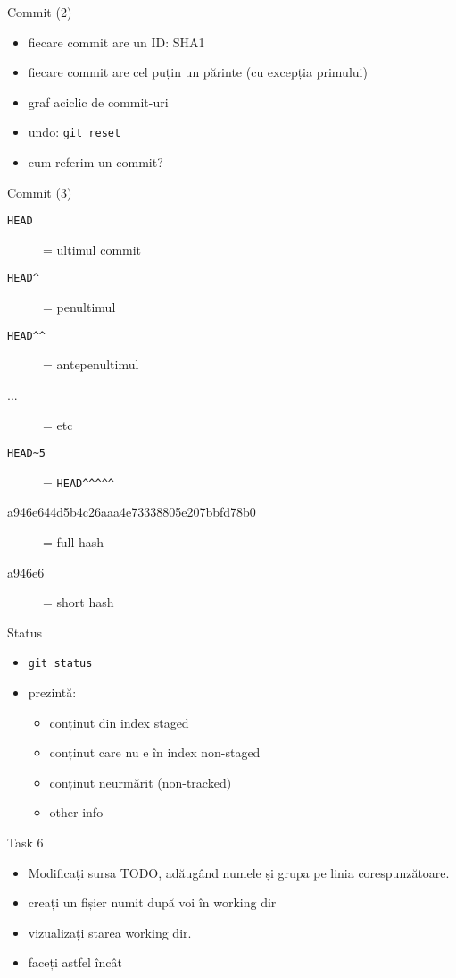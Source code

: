 \documentclass{beamer}
\begin{document}
\begin{frame}{Commit (2)}
  \begin{itemize}
    \item fiecare commit are un ID: SHA1
    \item fiecare commit are cel puțin un părinte (cu excepția primului)
    \item graf aciclic de commit-uri
    \pause
    \item undo: \texttt{git reset}
    \pause
    \item cum referim un commit?
  \end{itemize}
\end{frame}

\begin{frame}{Commit (3)}
  \begin{description}
    \item[\texttt{HEAD}] = ultimul commit
    \item[\texttt{HEAD\textasciicircum}] = penultimul
    \item[\texttt{HEAD\textasciicircum\textasciicircum}] = antepenultimul
    \item[...] = etc
    \pause
    \item[\texttt{HEAD\textasciitilde5}] = \texttt{HEAD\textasciicircum\textasciicircum\textasciicircum\textasciicircum\textasciicircum}
    \pause
    \item[a946e644d5b4c26aaa4e73338805e207bbfd78b0] = full hash
    \pause
    \item[a946e6] = short hash
  \end{description}
\end{frame}

\begin{frame}{Status}
  \begin{itemize}
    \item \texttt{git status}
    \item prezintă:
      \begin{itemize}
        \item conținut din index {staged}
        \item conținut care nu e în index {non-staged}
        \item conținut neurmărit (non-tracked)
        \item other info
      \end{itemize}
  \end{itemize}
  \pause
  \begin{alertblock}{Task 6}
    \begin{itemize}
      \item Modificați sursa TODO, adăugând numele și grupa pe linia
      corespunzătoare.
      \item creați un fișier numit după voi în working dir
      \item vizualizați starea working dir.
      \item faceți astfel încât
    \end{itemize}
  \end{alertblock}
\end{frame}
\end{document}
